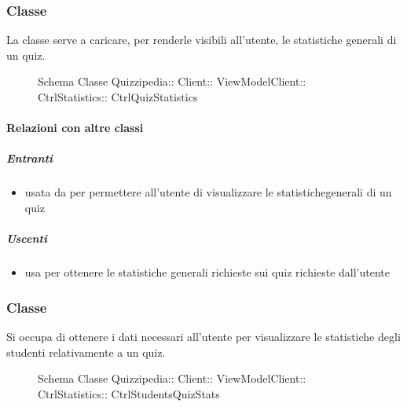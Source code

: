 \subsubsection{Classe }
La classe serve a caricare, per renderle visibili all'utente, le statistiche generali di un quiz.
\begin{figure}[H]
\centering
\noindent{}
\caption[Schema Classe CtrlQuizStatistics]{Schema Classe Quizzipedia:: Client:: ViewModelClient:: CtrlStatistics:: CtrlQuizStatistics}
\end{figure}
\paragraph{Relazioni con altre classi}
\subparagraph{Entranti}
\begin{itemize}
\item usata da  per permettere all'utente di visualizzare le statistichegenerali di un quiz
\end{itemize}
\subparagraph{Uscenti}
\begin{itemize}
\item usa  per ottenere le statistiche generali richieste sui quiz richieste dall'utente
\end{itemize}
\subsubsection{Classe }
Si occupa di ottenere i dati necessari all'utente per visualizzare le statistiche degli studenti relativamente a un quiz.
\begin{figure}[H]
\centering
\noindent{}
\caption[Schema Classe CtrlStudentsQuizStats]{Schema Classe Quizzipedia:: Client:: ViewModelClient:: CtrlStatistics:: CtrlStudentsQuizStats}
\end{figure}
